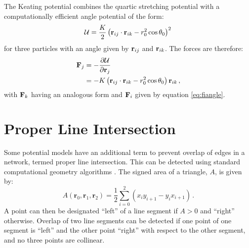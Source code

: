 The Keating potential combines the quartic stretching potential with a computationally efficient angle potential of the form:
\begin{equation}
	\mathcal{U} = \frac{K}{2}\left(\mathbf{r}_{ij}\cdot\mathbf{r}_{ik}-r_0^2\cos\theta_0\right)^2\,
\end{equation}
for three particles with an angle given by $\mathbf{r}_{ij}$ and $\mathbf{r}_{ik}$.
The forces are therefore:
\begin{align}
	\mathbf{F}_j&=-\frac{\partial \mathcal{U}}{\partial \mathbf{r}_j} \nonumber \\ 
	&=-K\left(\mathbf{r}_{ij}\cdot\mathbf{r}_{ik}-r_0^2\cos\theta_0\right)\mathbf{r}_{ik} \,,
\end{align}
with $\mathbf{F}_k$ having an analogous form and $\mathbf{F}_i$ given by equation \eqref{eq:fiangle}.

\section{Proper Line Intersection}

Some potential models have an additional term to prevent overlap of edges in a \td{} network, termed proper line intersection.
This can be detected using standard computational geometry algorithms \cite{ORourke1998}.
The signed area of a triangle, $A$, is given by:
\begin{equation}
	A\left(\mathbf{r}_0, \mathbf{r}_1, \mathbf{r}_2\right) = \frac{1}{2}\sum_{i=0}^{2} \left(x_iy_{i+1}-y_ix_{i+1}\right)\,.
\end{equation}
A point can then be designated ``left'' of a line segment if $A>0$ and ``right'' otherwise.
Overlap of two line segments can be detected if one point of one segment is ``left'' and the other point ``right'' with respect to the other segment, and no three points are collinear.
